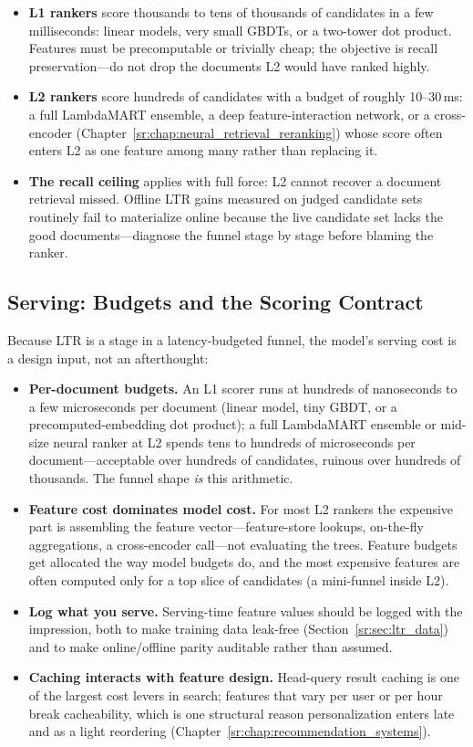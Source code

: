 \begin{itemize}
    \item \textbf{L1 rankers} score thousands to tens of thousands of candidates in a few milliseconds: linear models, very small GBDTs, or a two-tower dot product. Features must be precomputable or trivially cheap; the objective is recall preservation---do not drop the documents L2 would have ranked highly.
    \item \textbf{L2 rankers} score hundreds of candidates with a budget of roughly 10--30\,ms: a full LambdaMART ensemble, a deep feature-interaction network, or a cross-encoder (Chapter~\ref{sr:chap:neural_retrieval_reranking}) whose score often enters L2 as one feature among many rather than replacing it.
    \item \textbf{The recall ceiling} applies with full force: L2 cannot recover a document retrieval missed. Offline LTR gains measured on judged candidate sets routinely fail to materialize online because the live candidate set lacks the good documents---diagnose the funnel stage by stage before blaming the ranker.
\end{itemize}

\subsection{Serving: Budgets and the Scoring Contract}

Because LTR is a stage in a latency-budgeted funnel, the model's serving cost is a design input, not an afterthought:

\begin{itemize}
    \item \textbf{Per-document budgets.} An L1 scorer runs at hundreds of nanoseconds to a few microseconds per document (linear model, tiny GBDT, or a precomputed-embedding dot product); a full LambdaMART ensemble or mid-size neural ranker at L2 spends tens to hundreds of microseconds per document---acceptable over hundreds of candidates, ruinous over hundreds of thousands. The funnel shape \textit{is} this arithmetic.
    \item \textbf{Feature cost dominates model cost.} For most L2 rankers the expensive part is assembling the feature vector---feature-store lookups, on-the-fly aggregations, a cross-encoder call---not evaluating the trees. Feature budgets get allocated the way model budgets do, and the most expensive features are often computed only for a top slice of candidates (a mini-funnel inside L2).
    \item \textbf{Log what you serve.} Serving-time feature values should be logged with the impression, both to make training data leak-free (Section~\ref{sr:sec:ltr_data}) and to make online/offline parity auditable rather than assumed.
    \item \textbf{Caching interacts with feature design.} Head-query result caching is one of the largest cost levers in search; features that vary per user or per hour break cacheability, which is one structural reason personalization enters late and as a light reordering (Chapter~\ref{sr:chap:recommendation_systems}).
\end{itemize}

